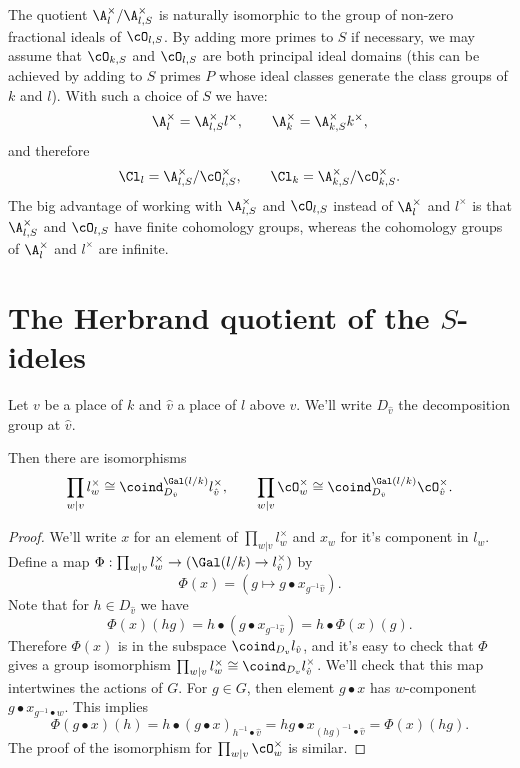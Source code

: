 The quotient $\A_l^\times / \A_{l,S}^\times$ is naturally isomorphic to the
group of non-zero fractional ideals of $\cO_{l,S}$.
By adding more primes to $S$ if necessary, we may assume that $\cO_{k,S}$ and $\cO_{l,S}$ are both
principal ideal domains (this can be achieved by adding to $S$ primes $P$ whose ideal classes
generate the class groups of $k$ and $l$).
With such a choice of $S$ we have:
\[
	\A_{l}^\times = \A_{l,S}^\times l^\times,
	\qquad
	\A_k^\times = \A_{k,S}^\times k^\times,
\]
and therefore
\[
	\Cl_{l} = \A_{l,S}^\times / \cO_{l,S}^\times, \qquad
	\Cl_{k} = \A_{k,S}^\times / \cO_{k,S}^\times.
\]
The big advantage of working with $\A_{l,S}^\times$ and $\cO_{l,S}$ instead of $\A_l^\times$ and
$l^\times$ is that $\A_{l,S}^\times$ and $\cO_{l,S}$ have finite cohomology groups,
whereas the cohomology groups of $\A_l^\times$ and $l^\times$ are infinite.





\section{The Herbrand quotient of the \texorpdfstring{$S$}{S}-ideles}

Let $v$ be a place of $k$ and $\hat v$ a place of $l$ above $v$.
We'll write $D_{\hat v}$ the decomposition group at $\hat v$.

\begin{lemma} \label{lem:semi-local iso coind}
	Then there are isomorphisms
	\[
		\prod_{w | v} l_w^\times
		\cong
		\coind_{D_{\hat v}}^{\Gal(l/k)} l_{\hat v}^\times,
		\qquad
		\prod_{w | v} \cO_w^\times
		\cong
		\coind_{D_{\hat v}}^{\Gal(l/k)} \cO_{\hat v}^\times.
	\]
\end{lemma}

\begin{proof}
	We'll write $x$ for an element of $\prod_{w | v} l_w^\times$ and $x_w$ for it's component in $l_w$.
	Define a map $\Phi : \prod_{w | v} l_w^\times \to (\Gal(l/k) \to l_{\hat v}^\times)$ by
	\[
		\Phi (x)
		=
		(g \mapsto g \bullet x_{g^{-1} \hat v}).
	\]
	Note that for $h \in D_{\hat v}$ we have
	\[
		\Phi (x) (hg) = h \bullet (g \bullet x_{g^{-1} \hat v}) = h \bullet \Phi(x) (g).
	\]
	Therefore $\Phi(x)$ is in the subspace $\coind_{D_v} l_{\hat v}$, and it's
	easy to check that $\Phi$ gives a group isomorphism
	$\prod_{w | v} l_w^\times \cong \coind_{D_v} l_{\hat v}^\times$.
	We'll check that this map intertwines the actions of $G$.
	For $g \in G$, then element $g \bullet x$ has $w$-component
	$g \bullet x_{g^{-1}\bullet w}$.
	This implies
	\[
		\Phi( g \bullet x)(h)
		=	h\bullet (g \bullet x)_{h^{-1} \bullet \hat v}
		=	h g \bullet x_{(hg)^{-1} \bullet \hat v}
		= \Phi (x) (hg).
	\]
	The proof of the isomorphism for $\prod_{w | v} \cO_w^\times$ is similar.
\end{proof}

